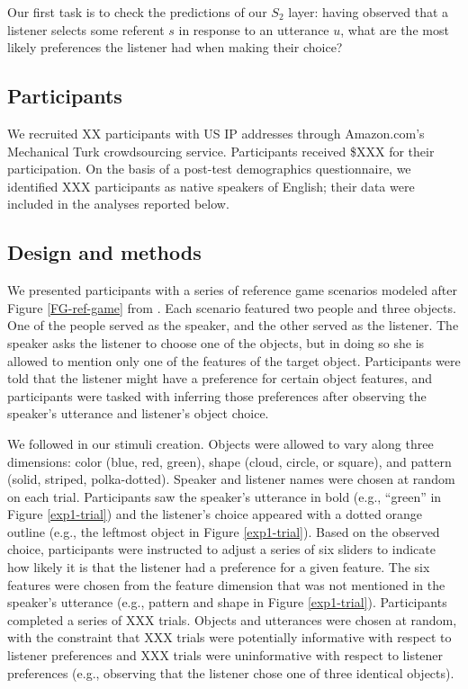 \documentclass[10pt,a4paper]{article}
\begin{document}
Our first task is to check the predictions of our $S_2$ layer: having observed that a listener selects some referent $s$ in response to an utterance $u$, what are the most likely preferences the listener had when making their choice? 

\subsection{Participants}

We recruited XX participants with US IP addresses through Amazon.com's Mechanical Turk crowdsourcing service. Participants received \$XXX for their participation. On the basis of a post-test demographics questionnaire, we identified XXX participants as native speakers of English; their data were included in the analyses reported below.

\subsection{Design and methods}

We presented participants with a series of reference game scenarios modeled after Figure \ref{FG-ref-game} from . Each scenario featured two people and three objects. One of the people served as the speaker, and the other served as the listener. The speaker asks the listener to choose one of the objects, but in doing so she is allowed to mention only one of the features of the target object. Participants were told that the listener might have a preference for certain object features, and participants were tasked with inferring those preferences after observing the speaker's utterance and listener's object choice.

We followed  in our stimuli creation. Objects were allowed to vary along three dimensions: color (blue, red, green), shape (cloud, circle, or square), and pattern (solid, striped, polka-dotted). Speaker and listener names were chosen at random on each trial. Participants saw the speaker's utterance in bold (e.g., ``green'' in Figure \ref{exp1-trial}) and the listener's choice appeared with a dotted orange outline (e.g., the leftmost object in Figure \ref{exp1-trial}). Based on the observed choice, participants were instructed to adjust a series of six sliders to indicate how likely it is that the listener had a preference for a given feature. The six features were chosen from the feature dimension that was not mentioned in the speaker's utterance (e.g., pattern and shape in Figure \ref{exp1-trial}). Participants completed a series of XXX trials. Objects and utterances were chosen at random, with the constraint that XXX trials were potentially informative with respect to listener preferences and XXX trials were uninformative with respect to listener preferences (e.g., observing that the listener chose one of three identical objects). 
\end{document}
